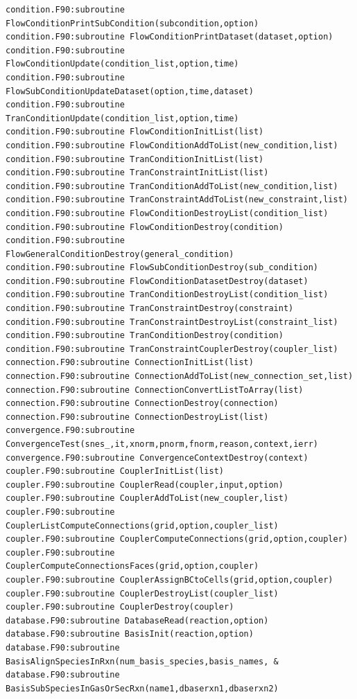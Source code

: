 \documentclass[12pt]{article}
\begin{document}
\begin{verbatim}
condition.F90:subroutine FlowConditionPrintSubCondition(subcondition,option)
condition.F90:subroutine FlowConditionPrintDataset(dataset,option)
condition.F90:subroutine FlowConditionUpdate(condition_list,option,time)
condition.F90:subroutine FlowSubConditionUpdateDataset(option,time,dataset)
condition.F90:subroutine TranConditionUpdate(condition_list,option,time)
condition.F90:subroutine FlowConditionInitList(list)
condition.F90:subroutine FlowConditionAddToList(new_condition,list)
condition.F90:subroutine TranConditionInitList(list)
condition.F90:subroutine TranConstraintInitList(list)
condition.F90:subroutine TranConditionAddToList(new_condition,list)
condition.F90:subroutine TranConstraintAddToList(new_constraint,list)
condition.F90:subroutine FlowConditionDestroyList(condition_list)
condition.F90:subroutine FlowConditionDestroy(condition)
condition.F90:subroutine FlowGeneralConditionDestroy(general_condition)
condition.F90:subroutine FlowSubConditionDestroy(sub_condition)
condition.F90:subroutine FlowConditionDatasetDestroy(dataset)
condition.F90:subroutine TranConditionDestroyList(condition_list)
condition.F90:subroutine TranConstraintDestroy(constraint)
condition.F90:subroutine TranConstraintDestroyList(constraint_list)
condition.F90:subroutine TranConditionDestroy(condition)
condition.F90:subroutine TranConstraintCouplerDestroy(coupler_list)
connection.F90:subroutine ConnectionInitList(list)
connection.F90:subroutine ConnectionAddToList(new_connection_set,list)
connection.F90:subroutine ConnectionConvertListToArray(list)
connection.F90:subroutine ConnectionDestroy(connection)
connection.F90:subroutine ConnectionDestroyList(list)
convergence.F90:subroutine ConvergenceTest(snes_,it,xnorm,pnorm,fnorm,reason,context,ierr)
convergence.F90:subroutine ConvergenceContextDestroy(context)
coupler.F90:subroutine CouplerInitList(list)
coupler.F90:subroutine CouplerRead(coupler,input,option)
coupler.F90:subroutine CouplerAddToList(new_coupler,list)
coupler.F90:subroutine CouplerListComputeConnections(grid,option,coupler_list)
coupler.F90:subroutine CouplerComputeConnections(grid,option,coupler)
coupler.F90:subroutine CouplerComputeConnectionsFaces(grid,option,coupler)
coupler.F90:subroutine CouplerAssignBCtoCells(grid,option,coupler)
coupler.F90:subroutine CouplerDestroyList(coupler_list)
coupler.F90:subroutine CouplerDestroy(coupler)
database.F90:subroutine DatabaseRead(reaction,option)
database.F90:subroutine BasisInit(reaction,option)
database.F90:subroutine BasisAlignSpeciesInRxn(num_basis_species,basis_names, &
database.F90:subroutine BasisSubSpeciesInGasOrSecRxn(name1,dbaserxn1,dbaserxn2)

\end{verbatim}
\end{document}
